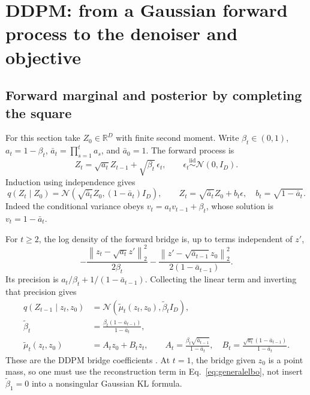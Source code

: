 \documentclass{article}
\theoremstyle{remark}\newtheorem{remark}[theorem]{Remark}
\newcommand{\R}{\mathbb R}
\newcommand{\norm}[1]{\left\lVert #1\right\rVert}
\begin{document}
\section{DDPM: from a Gaussian forward process to the denoiser and objective}
\label{sec:ddpm}
\subsection{Forward marginal and posterior by completing the square}
For this section take $Z_0\in\R^D$ with finite second moment. Write $\beta_t\in(0,1)$, $a_t=1-\beta_t$, $\bar a_t=\prod_{s=1}^t a_s$, and $\bar a_0=1$. The forward process is
\begin{equation}
 Z_t=\sqrt{a_t}Z_{t-1}+\sqrt{\beta_t}\,\epsilon_t,
 \qquad\epsilon_t\overset{\mathrm{iid}}\sim\mathcal N(0,I_D).
\end{equation}
Induction using independence gives
\begin{equation}
 q(Z_t\mid Z_0)=\mathcal N(\sqrt{\bar a_t}Z_0,(1-\bar a_t)I_D),
 \qquad Z_t=\sqrt{\bar a_t}Z_0+b_t\epsilon,\quad b_t=\sqrt{1-\bar a_t}.
 \label{eq:gaussianforward}
\end{equation}
Indeed the conditional variance obeys $v_t=a_tv_{t-1}+\beta_t$, whose solution is $v_t=1-\bar a_t$.

For $t\ge2$, the log density of the forward bridge is, up to terms independent of $z'$, 
\begin{equation}
 -\frac{\norm{z_t-\sqrt{a_t}z'}_2^2}{2\beta_t}
 -\frac{\norm{z'-\sqrt{\bar a_{t-1}}z_0}_2^2}{2(1-\bar a_{t-1})}.
\end{equation}
Its precision is $a_t/\beta_t+1/(1-\bar a_{t-1})$. Collecting the linear term and inverting that precision gives
\begin{align}
 q(Z_{t-1}\mid z_t,z_0)&=\mathcal N(\widetilde\mu_t(z_t,z_0),\widetilde\beta_tI_D),\label{eq:gaussianposterior}\\
 \widetilde\beta_t&=\frac{\beta_t(1-\bar a_{t-1})}{1-\bar a_t},\nonumber\\
 \widetilde\mu_t(z_t,z_0)&=A_tz_0+B_tz_t,\qquad
 A_t=\frac{\beta_t\sqrt{\bar a_{t-1}}}{1-\bar a_t},\quad
 B_t=\frac{\sqrt{a_t}(1-\bar a_{t-1})}{1-\bar a_t}.
 \label{eq:gaussiancoeffs}
\end{align}
These are the DDPM bridge coefficients \cite{ddpm}. At $t=1$, the bridge given $z_0$ is a point mass, so one must use the reconstruction term in Eq.~\eqref{eq:generalelbo}, not insert $\widetilde\beta_1=0$ into a nonsingular Gaussian KL formula.
\end{document}
